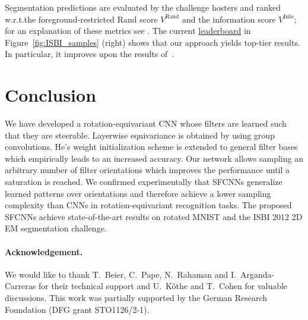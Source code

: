 \documentclass[10pt,twocolumn,letterpaper]{article}
\begin{document}
Segmentation predictions are evaluated by the challenge hosters and ranked w.r.t.\@ the foreground-restricted Rand score $V^\text{Rand}$ and the information score $V^\text{Info}$; for an explanation of these metrics see \cite{arganda2015crowdsourcing}.
The current
\href{http://brainiac2.mit.edu/isbi_challenge/leaders-board-new}{leaderboard}
in Figure~\ref{fig:ISBI_samples} (right) shows that our approach yields top-tier results.
In particular, it improves upon the results of~\cite{beier2017multicut}.




\vspace{-.25ex}
\section{Conclusion}
\vspace{-.5ex}

We have developed a rotation-equivariant CNN whose filters are learned such that they are steerable.
Layerwise equivariance is obtained by using group convolutions.
He's weight initialization scheme is extended to general filter bases which empirically leads to an increased accuracy.
Our network allows sampling an arbitrary number of filter orientations which improves the performance until a saturation is reached.
We confirmed experimentally that \mbox{SFCNNs} generalize learned patterns over orientations and therefore achieve a lower sampling complexity than CNNs in rotation-equivariant recognition tasks.
The proposed \mbox{SFCNNs} achieve state-of-the-art results on rotated MNIST and the ISBI 2012 2D EM segmentation challenge.





\paragraph*{Acknowledgement.}
We would like to thank 
T.~Beier, C.~Pape, N.~Rahaman and I.~Arganda-Carreras for their technical support
and U.~K\"othe and T.~Cohen for valuable discussions.
This work was partially supported by the German Research Foundation (DFG grant STO1126/2-1). 










\appendix
{}\\
\end{document}

